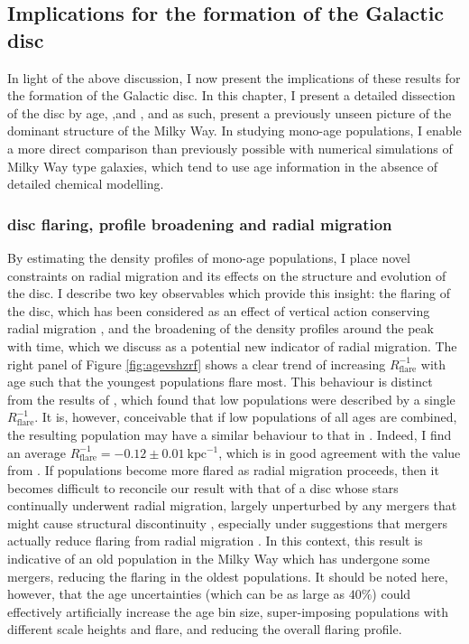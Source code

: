 \subsection{Implications for the formation of the Galactic disc}
\label{sec:implications}

In light of the above discussion, I now present the implications of these results for the formation of the Galactic disc. In this chapter, I present a detailed dissection of the disc by age, \feh{},and \afe{}, and as such, present a previously unseen picture of the dominant structure of the Milky Way. In studying mono-age populations, I enable a more direct comparison than previously possible with numerical simulations of Milky Way type galaxies, which tend to use age information in the absence of detailed chemical modelling.

\subsubsection{disc flaring, profile broadening and radial migration}

By estimating the density profiles of mono-age populations, I  place novel constraints on radial migration and its effects on the structure and evolution of the disc. I describe two key observables which provide this insight: the flaring of the disc, which has been considered as an effect of vertical action conserving radial migration \citep[where stars have greater vertical excursions as they migrate outward, e.g.][]{2012A&A...548A.127M}, and the broadening of the density profiles around the peak with time, which we discuss as a potential new indicator of radial migration. The right panel of Figure \ref{fig:agevshzrf} shows a clear trend of increasing $R_{\mathrm{flare}}^{-1}$ with age such that the youngest populations flare most. This behaviour is distinct from the results of \citet{2016ApJ...823...30B}, which found that low \afe{} populations were described by a single $R_{\mathrm{flare}}^{-1}$. It is, however, conceivable that if low \afe{} populations of all ages are combined, the resulting population may have a similar behaviour to that in \citet{2016ApJ...823...30B}. Indeed, I find an average $R_{\mathrm{flare}}^{-1} = -0.12\pm 0.01\ \mathrm{kpc^{-1}}$, which is in good agreement with the value from \citet{2016ApJ...823...30B}. If populations become more flared as radial migration proceeds, then it becomes difficult to reconcile our result with that of a disc whose stars continually underwent radial migration, largely unperturbed by any mergers that might cause structural discontinuity \citep[e.g.][]{2014MNRAS.442.2474M}, especially under suggestions that mergers actually reduce flaring from radial migration \citep[e.g.][]{2014A&A...572A..92M}. In this context, this result is indicative of an old population in the Milky Way which has undergone some mergers, reducing the flaring in the oldest populations. It should be noted here, however, that the age uncertainties (which can be as large as $40\%$) could effectively artificially increase the age bin size, super-imposing populations with different scale heights and flare, and reducing the overall flaring profile.

